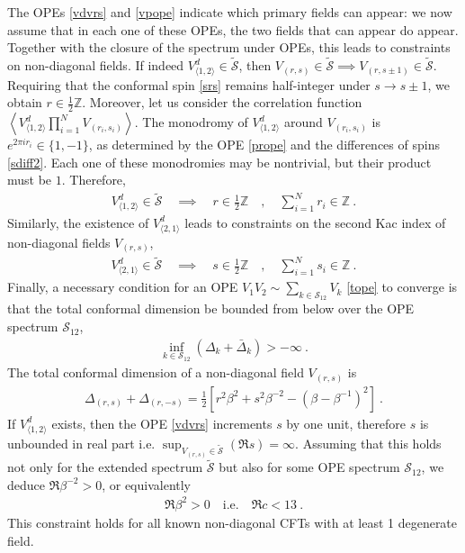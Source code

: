 \documentclass[12pt, a4paper]{article}
\theoremstyle{break}
\begin{document}
The OPEs \eqref{vdvrs} and \eqref{vpope} indicate which primary fields can appear: we now assume that in each one of these OPEs, the two fields that can appear do appear. 
Together with the closure of the spectrum under OPEs, this leads to constraints on non-diagonal fields. If indeed $V^d_{\langle 1,2\rangle}\in\widetilde{\mathcal{S}}$, then $V_{(r,s)}\in\widetilde{\mathcal{S}}\implies V_{(r,s\pm 1)}\in\widetilde{\mathcal{S}}$. 
 Requiring that the conformal spin \eqref{srs} remains half-integer under $s\to s\pm 1$, we obtain
 $r\in \frac12 \mathbb{Z}$.
Moreover, let us  consider the correlation function $\left<V^d_{\langle 1,2\rangle}\prod_{i=1}^NV_{(r_i,s_i)}\right>$. 
The monodromy of $V^d_{\langle 1,2\rangle}$  around $V_{(r_i,s_i)}$ is $e^{2\pi ir_i}\in \{1,-1\}$, as determined by the OPE \eqref{prope} and the differences of spins \eqref{sdiff2}. Each one of these monodromies may be nontrivial, but their product must be $1$. Therefore, 
\begin{align}
 \boxed{V^d_{\langle 1,2\rangle}\in\widetilde{\mathcal{S}} \quad \implies\quad  r\in \frac12\mathbb{Z} \quad , \quad \sum_{i=1}^N r_i  \in \mathbb{Z}}\ . 
 \label{sriz}
\end{align}
Similarly, the existence of $V^d_{\langle 2,1\rangle}$ leads to constraints on the second Kac index of non-diagonal fields $V_{(r,s)}$,
\begin{align}
 \boxed{V^d_{\langle 2,1\rangle}\in\widetilde{\mathcal{S}} \quad \implies\quad  s\in \frac12\mathbb{Z} \quad , \quad \sum_{i=1}^N s_i  \in \mathbb{Z}}\ . 
 \label{ssiz}
\end{align}
Finally, a necessary condition for an OPE $V_1V_2\sim \sum_{k\in\mathcal{S}_{12}}V_k$ \eqref{tope} to converge is that the total conformal dimension be bounded from below over the OPE spectrum $\mathcal{S}_{12}$,
\begin{align}
 \boxed{\inf_{k\in \mathcal{S}_{12}}\left(\Delta_k+\bar\Delta_k\right) > -\infty} \ . 
 \label{iddb}
\end{align}
The total conformal dimension of a non-diagonal field $V_{(r,s)}$ is 
\begin{align}
 \Delta_{(r,s)}+\Delta_{(r,-s)} = \frac12\left[ r^2\beta^{2} + s^2\beta^{-2}  -\left(\beta-\beta^{-1}\right)^2\right]\ .
\end{align}
If $V^d_{\langle 1,2\rangle}$ exists, then the OPE \eqref{vdvrs} increments $s$ by one unit, therefore $s$ is unbounded in real part i.e. $\sup_{V_{(r,s)}\in \widetilde{\mathcal{S}}} \left(\Re s\right) = \infty$. Assuming that this holds not only for the extended spectrum $\widetilde{\mathcal{S}}$ but also for some OPE spectrum $\mathcal{S}_{12}$, we deduce $\Re\beta^{-2}>0$, or equivalently 
\begin{align}
 \boxed{\Re\beta^2 > 0 \quad \text{i.e.} \quad \Re c < 13}\ .
 \label{rbp}
\end{align}
This constraint holds for all known non-diagonal CFTs with at least 1 degenerate field. 
\end{document}

